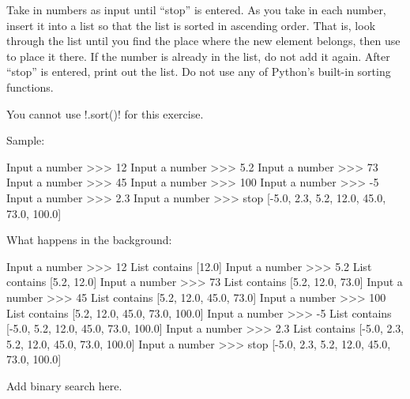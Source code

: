 \documentclass[11pt]{cselabheader}
\begin{document}
\begin{ex}[sorted.py] Take in numbers as input until ``stop'' is entered. As you
  take in each number, insert it into a list so that the list is sorted in
  ascending order. That is, look through the list until you find the place where
  the new element belongs, then use  to place it there.
  If the number is already in the list, do not add it again. After ``stop'' is
  entered, print out the list. Do not use any of Python's built-in sorting
  functions.

  You cannot use \pythoninline!.sort()! for this exercise.

  Sample:

  \begin{verbatimcode}
Input a number >>> 12
Input a number >>> 5.2
Input a number >>> 73
Input a number >>> 45
Input a number >>> 100
Input a number >>> -5
Input a number >>> 2.3
Input a number >>> stop
[-5.0, 2.3, 5.2, 12.0, 45.0, 73.0, 100.0]
  \end{verbatimcode}

  What happens in the background:

  \begin{verbatimcode}
Input a number >>> 12
List contains [12.0]
Input a number >>> 5.2
List contains [5.2, 12.0]
Input a number >>> 73
List contains [5.2, 12.0, 73.0]
Input a number >>> 45
List contains [5.2, 12.0, 45.0, 73.0]
Input a number >>> 100
List contains [5.2, 12.0, 45.0, 73.0, 100.0]
Input a number >>> -5
List contains [-5.0, 5.2, 12.0, 45.0, 73.0, 100.0]
Input a number >>> 2.3
List contains [-5.0, 2.3, 5.2, 12.0, 45.0, 73.0, 100.0]
Input a number >>> stop
[-5.0, 2.3, 5.2, 12.0, 45.0, 73.0, 100.0]
  \end{verbatimcode}

\end{ex}

\begin{ex}[binary.py]
  Add binary search here.
\end{ex}
\end{document}
